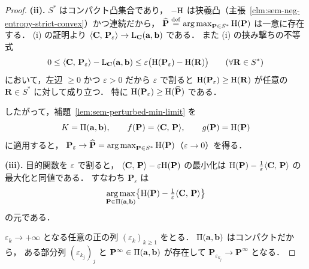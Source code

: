 \begin{proof}
  \textbf{(ii).}
  $S^*$ はコンパクト凸集合であり，
  $-\mathrm{H}$ は狭義凸（主張~\ref{clm:sem-neg-entropy-strict-convex}）かつ連続だから，
  $\widehat{\mathbf{P}} \overset{\mathrm{def}}{=} \operatorname*{arg\,max}_{\mathbf{P} \in S^*}\mathrm{H}(\mathbf{P})$
  は一意に存在する．
  (i) の証明より
  $\langle \mathbf{C},\, \mathbf{P}_\varepsilon \rangle \to \mathrm{L}_{\mathbf{C}}(\mathbf{a},\mathbf{b})$
  である．
  また (i) の挟み撃ちの不等式
  \[
    0
    \leq
    \langle \mathbf{C},\, \mathbf{P}_\varepsilon \rangle - \mathrm{L}_{\mathbf{C}}(\mathbf{a},\mathbf{b})
    \leq
    \varepsilon\bigl(\mathrm{H}(\mathbf{P}_\varepsilon) - \mathrm{H}(\mathbf{R})\bigr)
    \qquad (\forall \mathbf{R} \in S^*)
  \]
  において，左辺 $\geq 0$ かつ $\varepsilon > 0$ だから
  $\varepsilon$ で割ると
  $\mathrm{H}(\mathbf{P}_\varepsilon) \geq \mathrm{H}(\mathbf{R})$
  が任意の $\mathbf{R} \in S^*$ に対して成り立つ．
  特に $\mathrm{H}(\mathbf{P}_\varepsilon) \geq \mathrm{H}(\widehat{\mathbf{P}})$ である．

  したがって，補題~\ref{lem:sem-perturbed-min-limit} を
  \[
    K = \Pi(\mathbf{a},\mathbf{b}),\qquad
    f(\mathbf{P}) = \langle \mathbf{C},\, \mathbf{P} \rangle,\qquad
    g(\mathbf{P}) = \mathrm{H}(\mathbf{P})
  \]
  に適用すると，
  $\mathbf{P}_\varepsilon \to \widehat{\mathbf{P}}
  = \operatorname*{arg\,max}_{\mathbf{P} \in S^*} \mathrm{H}(\mathbf{P})$（$\varepsilon \to 0$）を得る．

  \textbf{(iii).}
  目的関数を $\varepsilon$ で割ると，
  $\langle \mathbf{C},\, \mathbf{P} \rangle - \varepsilon\mathrm{H}(\mathbf{P})$ の最小化は
  $\mathrm{H}(\mathbf{P}) - \tfrac{1}{\varepsilon}\langle \mathbf{C},\, \mathbf{P} \rangle$
  の最大化と同値である．
  すなわち $\mathbf{P}_\varepsilon$ は
  \[
    \operatorname*{arg\,max}_{\mathbf{P} \in \Pi(\mathbf{a},\mathbf{b})}
    \bigl\{\mathrm{H}(\mathbf{P})
    - \tfrac{1}{\varepsilon}\langle \mathbf{C},\, \mathbf{P} \rangle\bigr\}
  \]
  の元である．

  $\varepsilon_k \to +\infty$ となる任意の正の列 $(\varepsilon_k)_{k \geq 1}$ をとる．
  $\Pi(\mathbf{a},\mathbf{b})$ はコンパクトだから，
  ある部分列 $(\varepsilon_{k_j})_j$ と
  $\mathbf{P}^\infty \in \Pi(\mathbf{a},\mathbf{b})$ が存在して
  $\mathbf{P}_{\varepsilon_{k_j}} \to \mathbf{P}^\infty$ となる．


\end{proof}
